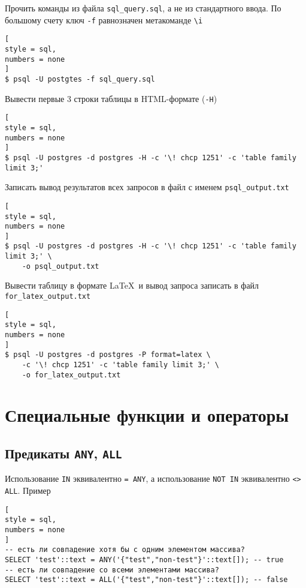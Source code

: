 \documentclass[%
	11pt,
	a4paper,
	utf8,
		]{article}
\begin{document}

Прочить команды из файла \texttt{sql\_query.sql}, а не из стандартного ввода. По большому счету ключ \texttt{-f} равнозначен метакоманде \verb|\i|
\begin{lstlisting}[
style = sql,
numbers = none
]
$ psql -U postgtes -f sql_query.sql
\end{lstlisting}

Вывести первые 3 строки таблицы в HTML-формате (\texttt{-H})
\begin{lstlisting}[
style = sql,
numbers = none
]
$ psql -U postgres -d postgres -H -c '\! chcp 1251' -c 'table family limit 3;'
\end{lstlisting}

Записать вывод результатов всех запросов в файл с именем \texttt{psql\_output.txt}
\begin{lstlisting}[
style = sql,
numbers = none
]
$ psql -U postgres -d postgres -H -c '\! chcp 1251' -c 'table family limit 3;' \
    -o psql_output.txt
\end{lstlisting}

Вывести таблицу в формате \LaTeX\ и вывод запроса записать в файл \texttt{for\_latex\_output.txt}
\begin{lstlisting}[
style = sql,
numbers = none
]
$ psql -U postgres -d postgres -P format=latex \
    -c '\! chcp 1251' -c 'table family limit 3;' \
    -o for_latex_output.txt
\end{lstlisting}



\section{Специальные функции и операторы}

\subsection{Предикаты \texttt{ANY}, \texttt{ALL}}

Использование \texttt{IN} эквивалентно \texttt{= ANY}, а использование \texttt{NOT IN} эквивалентно \texttt{<> ALL}. Пример
\begin{lstlisting}[
style = sql,
numbers = none
]
-- есть ли совпадение хотя бы с одним элементом массива?
SELECT 'test'::text = ANY('{"test","non-test"}'::text[]); -- true
-- есть ли совпадение со всеми элементами массива?
SELECT 'test'::text = ALL('{"test","non-test"}'::text[]); -- false
\end{lstlisting}
\end{document}
